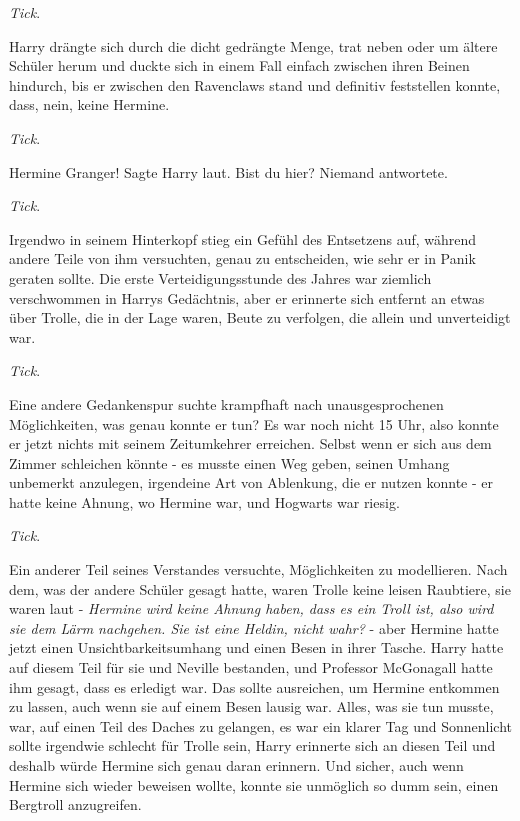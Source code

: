 \emph{Tick}.

Harry drängte sich durch die dicht gedrängte Menge, trat neben oder um ältere
Schüler herum und duckte sich in einem Fall einfach zwischen ihren Beinen
hindurch, bis er zwischen den Ravenclaws stand und definitiv feststellen konnte,
dass, nein, keine Hermine.

\emph{Tick}.

\glqq{}Hermine Granger!\grqq{} Sagte Harry laut. \glqq{}Bist du hier?\grqq{}
Niemand antwortete.

\emph{Tick}.

Irgendwo in seinem Hinterkopf stieg ein Gefühl des Entsetzens auf, während
andere Teile von ihm versuchten, genau zu entscheiden, wie sehr er in Panik
geraten sollte. Die erste Verteidigungsstunde des Jahres war ziemlich
verschwommen in Harrys Gedächtnis, aber er erinnerte sich entfernt an etwas über
Trolle, die in der Lage waren, Beute zu verfolgen, die allein und unverteidigt
war.

\emph{Tick}.

Eine andere Gedankenspur suchte krampfhaft nach unausgesprochenen Möglichkeiten,
was genau konnte er tun? Es war noch nicht 15 Uhr, also konnte er jetzt nichts
mit seinem Zeitumkehrer erreichen. Selbst wenn er sich aus dem Zimmer schleichen
könnte - es musste einen Weg geben, seinen Umhang unbemerkt anzulegen,
irgendeine Art von Ablenkung, die er nutzen konnte - er hatte keine Ahnung, wo
Hermine war, und Hogwarts war riesig.

\emph{Tick}.

Ein anderer Teil seines Verstandes versuchte, Möglichkeiten zu modellieren. Nach
dem, was der andere Schüler gesagt hatte, waren Trolle keine leisen Raubtiere,
sie waren laut - \emph{Hermine wird keine Ahnung haben, dass es ein Troll ist,
also wird sie dem Lärm nachgehen. Sie ist eine Heldin, nicht wahr?} - aber
Hermine hatte jetzt einen Unsichtbarkeitsumhang und einen Besen in ihrer Tasche.
Harry hatte auf diesem Teil für sie und Neville bestanden, und Professor
McGonagall hatte ihm gesagt, dass es erledigt war. Das sollte ausreichen, um
Hermine entkommen zu lassen, auch wenn sie auf einem Besen lausig war. Alles,
was sie tun musste, war, auf einen Teil des Daches zu gelangen, es war ein
klarer Tag und Sonnenlicht sollte irgendwie schlecht für Trolle sein, Harry
erinnerte sich an diesen Teil und deshalb würde Hermine sich genau daran
erinnern. Und sicher, auch wenn Hermine sich wieder beweisen wollte, konnte sie
unmöglich so dumm sein, einen Bergtroll anzugreifen.


